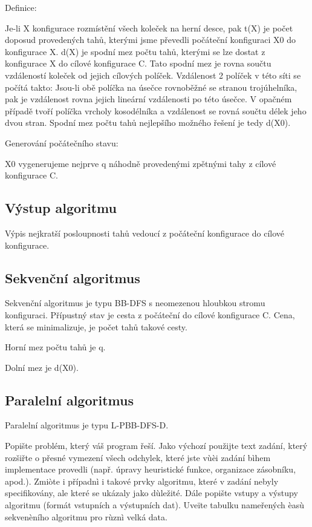 \documentclass[12pt]{article}
\begin{document}
Definice:

Je-li X konfigurace rozmístění všech koleček na herní desce, pak
t(X) je počet doposud provedených tahů, kterými jsme převedli počáteční konfiguraci X0 do konfigurace X.
d(X) je spodní mez počtu tahů, kterými se lze dostat z konfigurace X do cílové konfigurace C. Tato spodní mez je rovna součtu vzdáleností koleček od jejich cílových políček. Vzdálenost 2 políček v této síti se počítá takto: Jsou-li obě políčka na úsečce rovnoběžné se stranou trojúhelníka, pak je vzdálenost rovna jejich lineární vzdálenosti po této úsečce. V opačném případě tvoří políčka vrcholy kosodélníka a vzdálenost se rovná součtu délek jeho dvou stran. Spodní mez počtu tahů nejlepšího možného řešení je tedy d(X0).

Generování počátečního stavu:

X0 vygenerujeme nejprve q náhodně provedenými zpětnými tahy z cílové konfigurace C.

\subsection{Výstup algoritmu}

Výpis nejkratší posloupnosti tahů vedoucí z počáteční konfigurace do cílové konfigurace.

\subsection{Sekvenční algoritmus}

Sekvenční algoritmus je typu BB-DFS s neomezenou hloubkou stromu konfiguraci. Přípustný stav je cesta z počáteční do cílové konfigurace C. Cena, která se minimalizuje, je počet tahů takové cesty.

Horní mez počtu tahů je q.

Dolní mez je d(X0).

\subsection{Paralelní algoritmus}

Paralelní algoritmus je typu L-PBB-DFS-D.

Popište problém, který váš program řeší. Jako výchozí použijte text
zadání, který rozšiřte o přesné vymezení všech odchylek, které jste
vùèi zadání bìhem implementace provedli (např.  úpravy heuristické
funkce, organizace zásobníku, apod.). Zmiòte i případnì i takové
prvky algoritmu, které v zadání nebyly specifikovány, ale které se
ukázaly jako dùležité.  Dále popište vstupy a výstupy algoritmu
(formát vstupních a výstupních dat). Uveïte tabulku nameřených èasù
sekvenèního algoritmu pro rùznì velká data.
\end{document}
